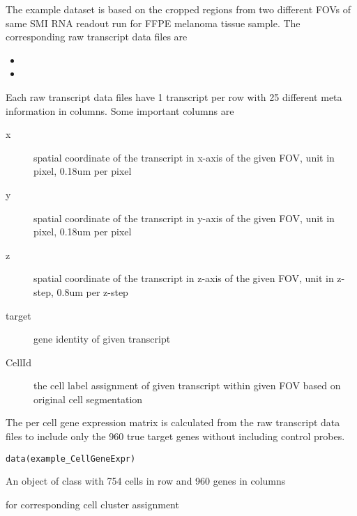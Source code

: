 \documentclass[letterpaper]{book}
\begin{document}
\begin{Description}
The example dataset is based on the cropped regions from two different FOVs of same SMI RNA readout run for FFPE melanoma tissue sample.
The corresponding raw transcript data files are
\begin{itemize}

\item{} 
\item{} 

\end{itemize}

Each raw transcript data files have 1 transcript per row with 25 different meta information in columns. Some important columns are
\begin{description}

\item[x] spatial coordinate of the transcript in x-axis of the given FOV, unit in pixel, 0.18um per pixel
\item[y] spatial coordinate of the transcript in y-axis of the given FOV, unit in pixel, 0.18um per pixel
\item[z] spatial coordinate of the transcript in z-axis of the given FOV, unit in z-step, 0.8um per z-step
\item[target] gene identity of given transcript
\item[CellId] the cell label assignment of given transcript within given FOV based on original cell segmentation

\end{description}

The per cell gene expression matrix is calculated from the raw transcript data files to include only the 960 true target genes without including control probes.
\end{Description}
%
\begin{Usage}
\begin{verbatim}
data(example_CellGeneExpr)
\end{verbatim}
\end{Usage}
%
\begin{Format}
An object of class  with 754 cells in row and 960 genes in columns
\end{Format}
%
\begin{SeeAlso}
 for corresponding cell cluster assignment
\end{SeeAlso}
\end{document}
